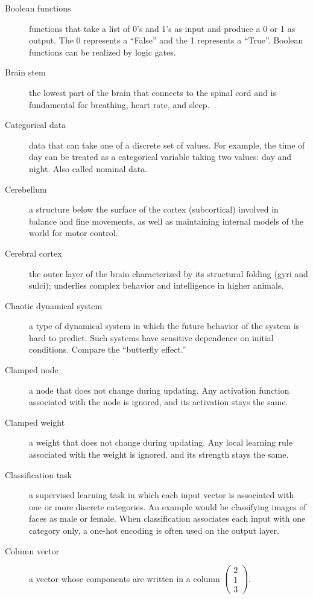\begin{description}
\item[Boolean functions] functions that take a list of 0's and 1's as input and produce a 0 or 1 as output. The 0 represents a ``False'' and the 1 represents a ``True''. Boolean functions can be realized by logic gates.

\item[Brain stem] the lowest part of the brain that connects to the spinal cord and is fundamental for breathing, heart rate, and sleep.

\item[Categorical data] data that can take one of a discrete set of values. For example, the time of day can be treated as a categorical variable taking two values: day and night. Also called nominal data.

\item[Cerebellum] a structure below the surface of the cortex (subcortical) involved in balance and fine movements, as well as maintaining internal models of the world for motor control.

\item[Cerebral cortex] the outer layer of the brain characterized by its structural folding (gyri and sulci); underlies complex behavior and intelligence in higher animals. 

\item[Chaotic dynamical system] a type of dynamical system in which the future behavior of the system is hard to predict. Such systems have sensitive dependence on initial conditions. Compare the ``butterfly effect.''

\item[Clamped node] a node that does not change during updating. Any activation function associated with the node is ignored, and its activation stays the same.

\item[Clamped weight] a weight that does not change during updating. Any local learning rule associated with the weight is ignored, and its strength stays the same.

\item[Classification task] a supervised learning task in which each input vector is associated with one or more discrete  categories. An example would be classifying images of faces as male or female. When classification associates each input with one category only, a one-hot encoding is often used on the output layer.

\item[Column vector] a vector whose components are written in a column \eg $\displaystyle \begin{pmatrix} 2 \\ 1 \\ 3 \end{pmatrix}$.


\end{description}

